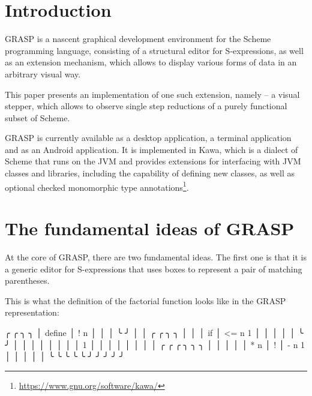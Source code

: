 \documentclass[acmsmall]{acmart}
\newenvironment{Snippet}{\Verbatim[samepage=true]}{\endVerbatim}
\begin{document}

\maketitle

\section{Introduction}

GRASP \cite{Godek2023} is a nascent graphical development environment
for the Scheme programming language, consisting of a structural editor
for S-expressions, as well as an extension mechanism, which allows to
display various forms of data in an arbitrary visual way.

This paper presents an implementation of one such extension, namely --
a visual stepper, which allows to observe single step reductions of a
purely functional subset of Scheme.

GRASP is currently available as a desktop application, a terminal
application and as an Android application.  It is implemented in Kawa,
which is a dialect of Scheme that runs on the JVM and provides
extensions for interfacing with JVM classes and libraries, including
the capability of defining new classes, as well as optional checked
monomorphic type
annotations\footnote{\url{https://www.gnu.org/software/kawa/}}.

\section{The fundamental ideas of GRASP}

At the core of GRASP, there are two fundamental ideas.  The first one
is that it is a generic editor for S-expressions that uses boxes to
represent a pair of matching parentheses.

This is what the definition of the factorial function looks like
in the GRASP representation:

\begin{Snippet}
╭        ╭     ╮                      ╮
│ define │ ! n │                      │
│        ╰     ╯                      │
│   ╭    ╭        ╮                 ╮ │
│   │ if │ <= n 1 │                 │ │
│   │    ╰        ╯                 │ │
│   │                               │ │
│   │       1                       │ │
│   │                               │ │
│   │       ╭     ╭   ╭       ╮ ╮ ╮ │ │
│   │       │ * n │ ! │ - n 1 │ │ │ │ │
╰   ╰       ╰     ╰   ╰       ╯ ╯ ╯ ╯ ╯
\end{Snippet}
\end{document}
